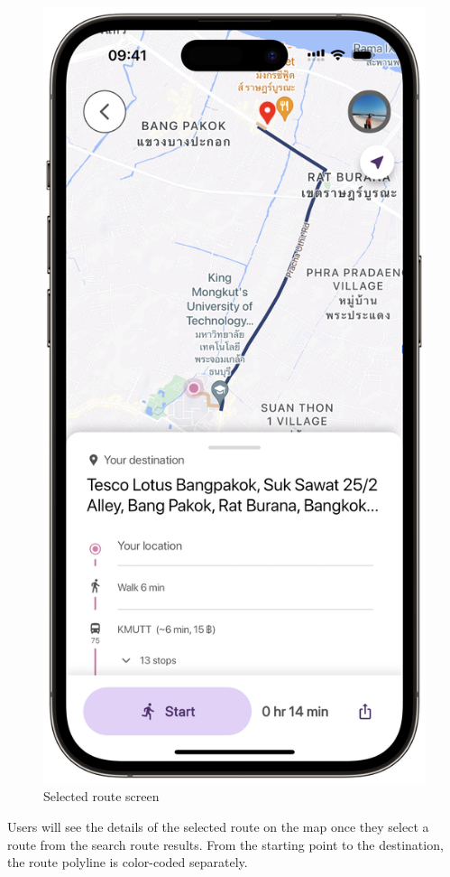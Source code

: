 \newpage
\begin{figure}[!h]
	\centering
	\includegraphics[width=0.5\linewidth]{chapter4/selected_route_screen.png}
	\caption{Selected route screen}
	\label{fig:Selected route screen}
\end{figure}
Users will see the details of the selected route on the map once they select a route from the search route results. From the starting point to the destination, the route polyline is color-coded separately.

